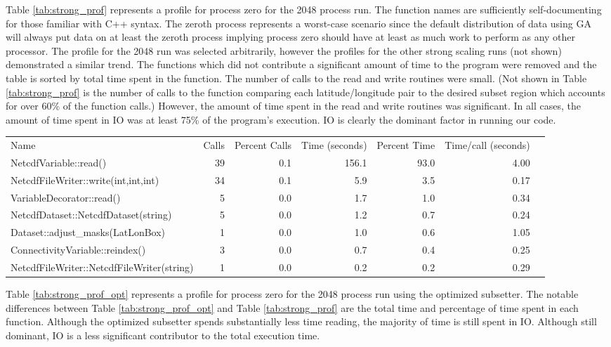 Table \ref{tab:strong_prof} represents a profile for process zero for the 2048
process run.  The function names are sufficiently self-documenting for those
familiar with C++ syntax.  The zeroth process represents a worst-case scenario
since the default distribution of data using GA will always put data on at
least the zeroth process implying process zero should have at least as much
work to perform as any other processor.  The profile for the 2048 run was
selected arbitrarily, however the profiles for the other strong scaling runs
(not shown) demonstrated a similar trend.  The functions which did not
contribute a significant amount of time to the program were removed and the
table is sorted by total time spent in the function.  The number of calls to
the read and write routines were small.  (Not shown in Table
\ref{tab:strong_prof} is the number of calls to the function comparing each
latitude/longitude pair to the desired subset region which accounts for over
60\% of the function calls.)  However, the amount of time spent in the read
and write routines was significant.  In all cases, the amount of time spent in
IO was at least 75\% of the program's execution.  IO is clearly the dominant
factor in running our code.

\begin{table*}[!t]
\center
\caption{Partial Profile for Process 0 at 2048 Cores - MJO Region}
\label{tab:strong_prof}
\begin{tabular}{lrrrrrr}
Name&Calls&Percent Calls&Time (seconds)&Percent Time&Time/call (seconds)\\
NetcdfVariable::read()                    &39&0.1&156.1&93.0&4.00\\
NetcdfFileWriter::write(int,int,int)      &34&0.1&  5.9& 3.5&0.17\\
VariableDecorator::read()                 & 5&0.0&  1.7& 1.0&0.34\\
NetcdfDataset::NetcdfDataset(string)      & 5&0.0&  1.2& 0.7&0.24\\
Dataset::adjust\_masks(LatLonBox)         & 1&0.0&  1.0& 0.6&1.05\\
ConnectivityVariable::reindex()           & 3&0.0&  0.7& 0.4&0.25\\
NetcdfFileWriter::NetcdfFileWriter(string)& 1&0.0&  0.2& 0.2&0.29\\
\end{tabular}
\end{table*}

Table \ref{tab:strong_prof_opt} represents a profile for process zero for
the 2048 process run using the optimized subsetter.  The notable differences
between Table \ref{tab:strong_prof_opt} and Table \ref{tab:strong_prof} are
the total time and percentage of time spent in each function.  Although the
optimized subsetter spends substantially less time reading, the majority of
time is still spent in IO.  Although still dominant, IO is a less significant
contributor to the total execution time.

